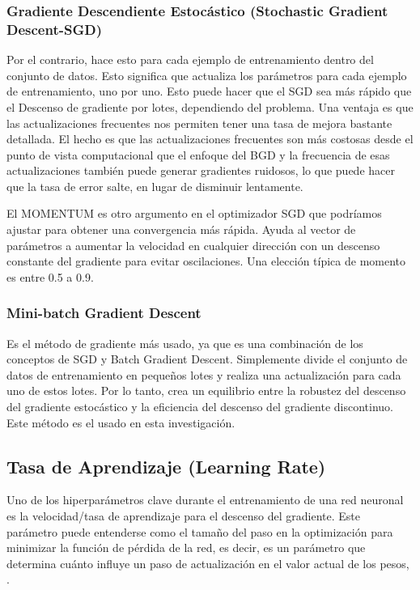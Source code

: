 		\subsubsection{Gradiente Descendiente Estocástico (Stochastic Gradient Descent-SGD)}

			Por el contrario, hace esto para cada ejemplo de entrenamiento dentro del conjunto de datos. Esto significa que actualiza los parámetros para cada ejemplo de entrenamiento, uno por uno. Esto puede hacer que el SGD sea más rápido que el Descenso de gradiente por lotes, dependiendo del problema. Una ventaja es que las actualizaciones frecuentes nos permiten tener una tasa de mejora bastante detallada. El hecho es que las actualizaciones frecuentes son más costosas desde el punto de vista computacional que el enfoque del BGD y la frecuencia de esas actualizaciones también puede generar gradientes ruidosos, lo que puede hacer que la tasa de error salte, en lugar de disminuir lentamente.

			El MOMENTUM es otro argumento en el optimizador SGD que podríamos ajustar para obtener una convergencia más rápida. Ayuda al vector de parámetros a aumentar la velocidad en cualquier dirección con un descenso constante del gradiente para evitar oscilaciones. Una elección típica de momento es entre 0.5 a 0.9.

		\subsubsection{Mini-batch Gradient Descent}

			Es el método de gradiente más usado, ya que es una combinación de los conceptos de SGD y Batch Gradient Descent. Simplemente divide el conjunto de datos de entrenamiento en pequeños lotes y realiza una actualización para cada uno de estos lotes. Por lo tanto, crea un equilibrio entre la robustez del descenso del gradiente estocástico y la eficiencia del descenso del gradiente discontinuo. Este método es el usado en esta investigación.


	\subsection{Tasa de Aprendizaje (Learning Rate)}
		Uno de los hiperparámetros clave durante el entrenamiento de una red neuronal es la velocidad/tasa de aprendizaje para el descenso del gradiente.
		Este parámetro puede entenderse como el tamaño del paso en la optimización para minimizar la función de pérdida de la red, es decir, es un parámetro que determina cuánto influye un paso de actualización en el valor actual de los pesos, \citep {AdamImg}. %

